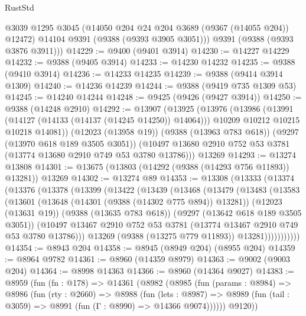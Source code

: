 \begin{lexlean}{RustStd}
\begin{coremodule}
        @3039
        @1295
        @3045
        (@14050 @204 @24 @204 @3689 (@9367 (@14055 @204)) @12472)
        @14104
        @9391
        (@9388 (@9393 @3905 @3051)))
      @9391
      (@9388 (@9393 @3876 @3911)))
@14229 := @9400 (@9401 @3914)
@14230 := @14227 @14229
@14232 := @9388 (@9405 @3914)
@14233 := @14230 @14232
@14235 := @9388 (@9410 @3914)
@14236 := @14233 @14235
@14239 := @9388 (@9414 @3914 @1309)
@14240 := @14236 @14239
@14244 := @9388 (@9419 @735 @1309 @53)
@14245 := @14240 @14244
@14248 := @9425 (@9426 (@9427 @3914))
@14250 := @9388 (@14248 @2910)
@14292 := @13907
    (@13925
      (@13976
        (@13986
          (@13991 (@14127 (@14133 (@14137 (@14245 @14250)) @14064)))
          @10209
          @10212
          @10215
          @10218
          @14081))
      (@12023 (@13958 @19))
      (@9388 (@13963 @783 @618))
      (@9297 (@13970 @618 @189 @3505 @3051))
      (@10497 @13680 @2910 @752 @53 @3781 (@13774 @13680 @2910 @749 @53 @3780 @13786)))
    @13269
@14293 := @13274 @13808
@14301 := @13675 (@13803 (@14292 (@9388 (@14293 @756 @11893)) @13281)) @13269
@14302 := @13274 @89
@14353 := @13308
    (@13333
      (@13374
        (@13376
          (@13378
            (@13399
              (@13422
                (@13439
                  (@13468
                    (@13479
                      (@13483
                        (@13583
                          (@13601
                            (@13648 (@14301 (@9388 (@14302 @775 @894)) @13281))
                            (@12023 (@13631 @19))
                            (@9388 (@13635 @783 @618))
                            (@9297 (@13642 @618 @189 @3505 @3051))
                            (@10497
                              @13467
                              @2910
                              @752
                              @53
                              @3781
                              (@13774 @13467 @2910 @749 @53 @3780 @13786)))
                          @13269
                          (@9388 (@13275 @779 @11893))
                          @13281)))))))))))
@14354 := @8943 @204
@14358 := @8945 (@8949 @204) (@8955 @204)
@14359 := @8964 @9782
@14361 := @8960 (@14359 @8979)
@14363 := @9002 (@9003 @204)
@14364 := @8998 @14363
@14366 := @8960 (@14364 @9027)
@14383 := @8959
    (fun (fn : @178) =>
    @14361
      (@8982
        (@8985
          (fun (params : @8984) =>
          @8986
            (fun (rty : @2660) =>
            @8988
              (fun (lets : @8987) =>
              @8989 (fun (tail : @3059) => @8991 (fun (Γ : @8990) => @14366 @9074))))))
        @9120))

\end{coremodule}
\end{lexlean}
